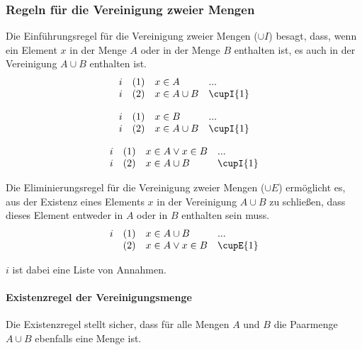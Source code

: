 \documentclass{book}
\theoremstyle{plain}
\theoremstyle{remark}
\theoremstyle{definition}
\begin{document}
\subsubsection{Regeln für die Vereinigung zweier Mengen}
\label{rule:cupI} \label{rule:cupE}

Die Einführungsregel für die Vereinigung zweier Mengen (\( \cup I \)) besagt, dass, wenn ein Element \( x \) in der Menge \( A \) oder in der Menge \( B \) enthalten ist, es auch in der Vereinigung \( A \cup B \) enthalten ist.
\[
\begin{array}{llll}
	i & (1) & x \in A & ... \\
	i & (2) & x \in A \cup B & \cupI{1} \\
\end{array}
\]

\[
\begin{array}{llll}
	i & (1) & x \in B & ... \\
	i & (2) & x \in A \cup B & \cupI{1} \\
\end{array}
\]

\[
\begin{array}{llll}
	i & (1) & x\in A\lor x \in B & ... \\
	i & (2) & x \in A \cup B & \cupI{1} \\
\end{array}
\]



Die Eliminierungsregel für die Vereinigung zweier Mengen (\( \cup E \)) ermöglicht es, aus der Existenz eines Elements \( x \) in der Vereinigung \( A \cup B \) zu schließen, dass dieses Element entweder in \( A \) oder in \( B \) enthalten sein muss.
\[
\begin{array}{llll}
	i & (1) & x \in A \cup B & ... \\
	& (2) & x \in A \lor x \in B & \cupE{1} \\
\end{array}
\]

\(i\) ist dabei eine Liste von Annahmen.

\paragraph{Existenzregel der Vereinigungsmenge}
\label{rule:cupSetExists}
Die Existenzregel stellt sicher, dass für alle Mengen \(A\) und \(B\) die Paarmenge \(A\cup B\) ebenfalls eine Menge ist.
\end{document}

